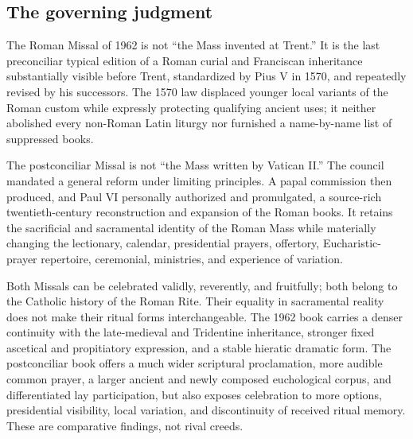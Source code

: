 \subsection{The governing judgment}

The Roman Missal of 1962 is not “the Mass invented at Trent.” It is the last preconciliar typical edition of a Roman curial and Franciscan inheritance substantially visible before Trent, standardized by Pius V in 1570, and repeatedly revised by his successors. The 1570 law displaced younger local variants of the Roman custom while expressly protecting qualifying ancient uses; it neither abolished every non-Roman Latin liturgy nor furnished a name-by-name list of suppressed books.

The postconciliar Missal is not “the Mass written by Vatican II.” The council mandated a general reform under limiting principles. A papal commission then produced, and Paul VI personally authorized and promulgated, a source-rich twentieth-century reconstruction and expansion of the Roman books. It retains the sacrificial and sacramental identity of the Roman Mass while materially changing the lectionary, calendar, presidential prayers, offertory, Eucharistic-prayer repertoire, ceremonial, ministries, and experience of variation.

Both Missals can be celebrated validly, reverently, and fruitfully; both belong to the Catholic history of the Roman Rite. Their equality in sacramental reality does not make their ritual forms interchangeable. The 1962 book carries a denser continuity with the late-medieval and Tridentine inheritance, stronger fixed ascetical and propitiatory expression, and a stable hieratic dramatic form. The postconciliar book offers a much wider scriptural proclamation, more audible common prayer, a larger ancient and newly composed euchological corpus, and differentiated lay participation, but also exposes celebration to more options, presidential visibility, local variation, and discontinuity of received ritual memory. These are comparative findings, not rival creeds.



